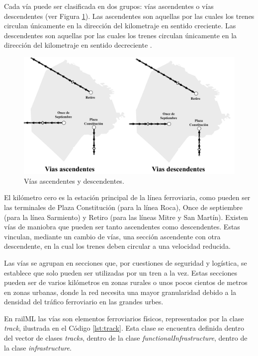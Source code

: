     Cada vía puede ser clasificada en dos grupos: vías ascendentes o vías descendentes (ver Figura \ref{fig:vias_2}). Las ascendentes son aquellas por las cuales los trenes circulan únicamente en la dirección del kilometraje en sentido creciente. Las descendentes son aquellas por las cuales los trenes circulan únicamente en la dirección del kilometraje en sentido decreciente \cite{RITO}. 

    \begin{figure}[H]
        \centering
        \includegraphics[width=1\textwidth]{Figuras/ascDesc.png}
        \centering\caption{Vías ascendentes y descendentes.}
        \label{fig:vias_2}
    \end{figure}

    El kilómetro cero es la estación principal de la línea ferroviaria, como pueden ser las terminales de Plaza Constitución (para la línea Roca), Once de septiembre (para la línea Sarmiento) y Retiro (para las líneas Mitre y San Martín).  Existen vías de maniobra que pueden ser tanto ascendentes como descendentes. Estas vinculan, mediante un cambio de vías, una sección ascendente con otra descendente, en la cual los trenes deben circular a una velocidad reducida. 

    Las vías se agrupan en secciones que, por cuestiones de seguridad y logística, se establece que solo pueden ser utilizadas por un tren a la vez. Estas secciones pueden ser de varios kilómetros en zonas rurales o unos pocos cientos de metros en zonas urbanas, donde la red necesita una mayor granularidad debido a la densidad del tráfico ferroviario en las grandes urbes.

    En railML las vías son elementos ferroviarios físicos, representados por la clase \textit{track}, ilustrada en el Código \ref{lst:track}. Esta clase se encuentra definida dentro del vector de clases \textit{tracks}, dentro de la clase \textit{functionalInfrastructure}, dentro de la clase \textit{infrastructure}.

